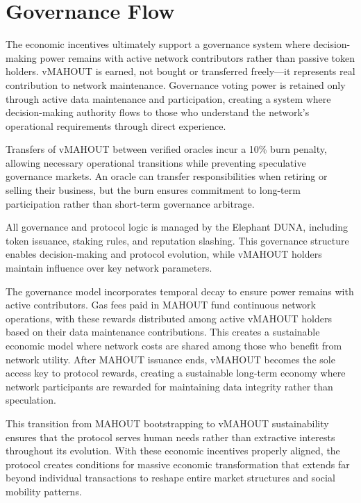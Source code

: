 \section{Governance Flow}

The economic incentives ultimately support a governance system where decision-making power remains with active network contributors rather than passive token holders. vMAHOUT is earned, not bought or transferred freely---it represents real contribution to network maintenance. Governance voting power is retained only through active data maintenance and participation, creating a system where decision-making authority flows to those who understand the network's operational requirements through direct experience.

Transfers of vMAHOUT between verified oracles incur a 10\% burn penalty, allowing necessary operational transitions while preventing speculative governance markets. An oracle can transfer responsibilities when retiring or selling their business, but the burn ensures commitment to long-term participation rather than short-term governance arbitrage.

All governance and protocol logic is managed by the Elephant DUNA, including token issuance, staking rules, and reputation slashing. This governance structure enables decision-making and protocol evolution, while vMAHOUT holders maintain influence over key network parameters.

The governance model incorporates temporal decay to ensure power remains with active contributors. Gas fees paid in MAHOUT fund continuous network operations, with these rewards distributed among active vMAHOUT holders based on their data maintenance contributions. This creates a sustainable economic model where network costs are shared among those who benefit from network utility. After MAHOUT issuance ends, vMAHOUT becomes the sole access key to protocol rewards, creating a sustainable long-term economy where network participants are rewarded for maintaining data integrity rather than speculation.

This transition from MAHOUT bootstrapping to vMAHOUT sustainability ensures that the protocol serves human needs rather than extractive interests throughout its evolution. With these economic incentives properly aligned, the protocol creates conditions for massive economic transformation that extends far beyond individual transactions to reshape entire market structures and social mobility patterns.